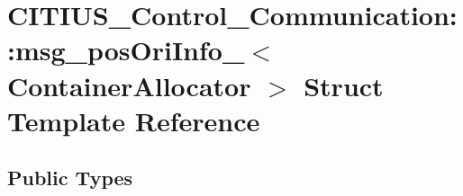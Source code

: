 \hypertarget{struct_c_i_t_i_u_s___control___communication_1_1msg__pos_ori_info__}{\section{\-C\-I\-T\-I\-U\-S\-\_\-\-Control\-\_\-\-Communication\-:\-:msg\-\_\-pos\-Ori\-Info\-\_\-$<$ \-Container\-Allocator $>$ \-Struct \-Template \-Reference}
\label{struct_c_i_t_i_u_s___control___communication_1_1msg__pos_ori_info__}
}
\subsection*{\-Public \-Types}
